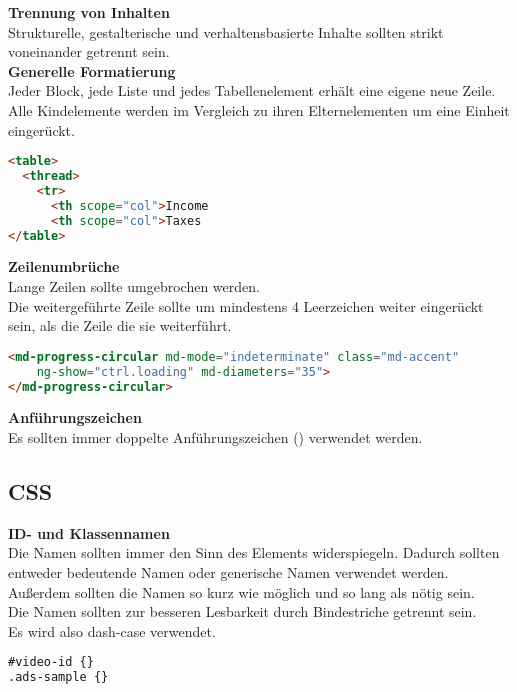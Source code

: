 \textbf{Trennung von Inhalten}\\
Strukturelle, gestalterische und verhaltensbasierte Inhalte sollten strikt voneinander getrennt sein.\\

\textbf{Generelle Formatierung}\\
Jeder Block, jede Liste und jedes Tabellenelement erhält eine eigene neue Zeile.\\
Alle Kindelemente werden im Vergleich zu ihren Elternelementen um eine Einheit eingerückt.
\begin{lstlisting}[language = HTML, caption = Generelle Formatierung von HTML Dokumenten, label = formatting]
<table>
  <thread>
  	<tr>
  	  <th scope="col">Income
  	  <th scope="col">Taxes
</table>
\end{lstlisting}

\textbf{Zeilenumbrüche}\\
Lange Zeilen sollte umgebrochen werden.\\
Die weitergeführte Zeile sollte um mindestens 4 Leerzeichen weiter eingerückt sein, als die Zeile die sie weiterführt.
\begin{lstlisting}[language = HTML, caption = Zeilenumbrüche, label = line-wrapping]
<md-progress-circular md-mode="indeterminate" class="md-accent"
	ng-show="ctrl.loading" md-diameters="35">
</md-progress-circular>
\end{lstlisting}

\textbf{Anführungszeichen}\\
Es sollten immer doppelte Anführungszeichen (\grqq \grqq) verwendet werden.\\

\subsection{CSS}
\textbf{ID- und Klassennamen}\\
Die Namen sollten immer den Sinn des Elements widerspiegeln. Dadurch sollten entweder bedeutende Namen oder generische Namen verwendet werden.\\ 
Außerdem sollten die Namen so kurz wie möglich und so lang als nötig sein.\\
Die Namen sollten zur besseren Lesbarkeit durch Bindestriche getrennt sein. \\
Es wird also dash-case verwendet.
\begin{lstlisting}[language = HTML, caption = ID- und Klassennamen, label = doctype]
#video-id {}
.ads-sample {}
\end{lstlisting}

